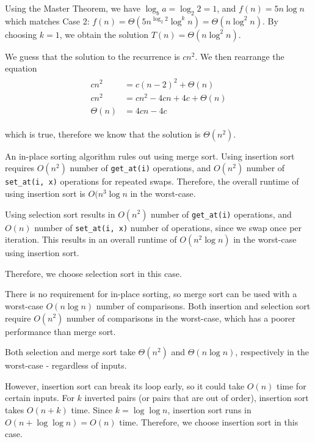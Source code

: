 \documentclass[12pt,twoside]{article}
\begin{document}
\begin{problems}
\begin{problemparts}
Using the Master Theorem, we have \(\log_b a = \log_2 2 = 1\), and \(f(n)=5n\log n\) which matches Case 2: \(f(n)=\Theta(5n^{\log_2 2} \log^k n)=\Theta(n \log^2 n)\). By choosing \(k=1\), we obtain the solution \(T(n)=\Theta(n \log^2 n)\).

\problempart %
We guess that the solution to the recurrence is \(cn^2\). We then rearrange the equation 
\begin{align*}
    \begin{split}
        cn^2 &= c(n-2)^2 + \Theta(n) \\
        cn^2 &= cn^2 - 4cn + 4c + \Theta(n) \\
        \Theta(n) &= 4cn - 4c
    \end{split}
\end{align*}

which is true, therefore we know that the solution is \(\Theta(n^2)\).

\end{problemparts}

\newpage
\problem  %

\begin{problemparts}
\problempart %
An in-place sorting algorithm rules out using merge sort. Using insertion sort requires \(O(n^2)\) number of \verb|get_at(i)| operations, and \(O(n^2)\) number of \verb|set_at(i, x)| operations for repeated swaps. Therefore, the overall runtime of using insertion sort is \(O(n^3\log n\) in the worst-case.

Using selection sort results in \(O(n^2)\) number of \verb|get_at(i)| operations, and \(O(n)\) number of \verb|set_at(i, x)| number of operations, since we swap once per iteration. This results in an overall runtime of \(O(n^2\log n)\) in the worst-case using insertion sort.

Therefore, we choose selection sort in this case.

\problempart %
There is no requirement for in-place sorting, so merge sort can be used with a worst-case \(O(n\log n)\) number of comparisons. Both insertion and selection sort require \(O(n^2)\) number of comparisons in the worst-case, which has a poorer performance than merge sort.

\problempart %
Both selection and merge sort take \(\Theta(n^2)\) and \(\Theta(n \log n)\), respectively in the worst-case - regardless of inputs.

However, insertion sort can break its loop early, so it could take \(O(n)\) time for certain inputs. For \(k\) inverted pairs (or pairs that are out of order), insertion sort takes \(O(n+k)\) time. Since \(k=\log \log n\), insertion sort runs in \(O(n + \log \log n) = O(n)\) time. Therefore, we choose insertion sort in this case.


\end{problemparts}
\end{problems}
\end{document}

